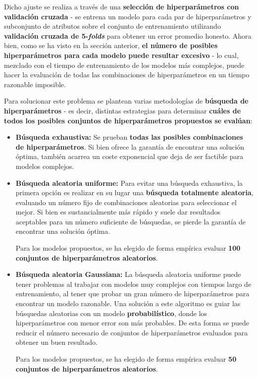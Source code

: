 Dicho ajuste se realiza a través de una \textbf{selección de hiperparámetros con validación cruzada} - se entrena un modelo para cada par de hiperparámetros y subconjunto de atributos sobre el conjunto de entrenamiento utilizando \textbf{validación cruzada de 5-\textit{folds}} para obtener un error promedio honesto. Ahora bien, como se ha visto en la sección anterior, \textbf{el número de posibles hiperparámetros para cada modelo puede resultar excesivo} - lo cual, mezclado con el tiempo de entrenamiento de los modelos más complejos, puede hacer la evaluación de todas las combinaciones de hiperparámetros en un tiempo razonable imposible. 

Para solucionar este problema se plantean varias metodologías de \textbf{búsqueda de hiperparámetros} - es decir, distintas estrategias para determinar \textbf{cuáles de todos los posibles conjuntos de hiperparámetros propuestos se evalúan}:
\begin{itemize}[parsep=2pt, itemsep=2pt, topsep=4pt]
	\item \textbf{Búsqueda exhaustiva:} Se prueban \textbf{todas las posibles combinaciones de hiperparámetros}. Si bien ofrece la garantía de encontrar una solución óptima, también acarrea un coste exponencial que deja de ser factible para modelos complejos.
	
	\item \textbf{Búsqueda aleatoria uniforme:} Para evitar una búsqueda exhaustiva, la primera opción es realizar en su lugar una \textbf{búsqueda totalmente aleatoria}, evaluando un número fijo de combinaciones aleatorias para seleccionar el mejor. Si bien es sustancialmente más rápido y suele dar resultados aceptables para un número suficiente de búsquedas, se pierde la garantía de encontrar una solución óptima.
	
	Para los modelos propuestos, se ha elegido de forma empírica evaluar \textbf{100 conjuntos de hiperparámetros aleatorios}.
	
	\item \textbf{Búsqueda aleatoria Gaussiana:} La búsqueda aleatoria uniforme puede tener problemas al trabajar con modelos muy complejos con tiempos largo de entrenamiento, al tener que probar un gran número de hiperparámetros para encontrar un modelo razonable. Una solución a este algoritmo es guiar las búsquedas aleatorias con un modelo \textbf{probabilístico}, donde los hiperparámetros con menor error son más probables. De esta forma se puede reducir el número necesario de conjuntos de hiperparámetros evaluados para obtener un buen resultado. 
	
	Para los modelos propuestos, se ha elegido de forma empírica evaluar \textbf{50 conjuntos de hiperparámetros aleatorios}.
\end{itemize}

